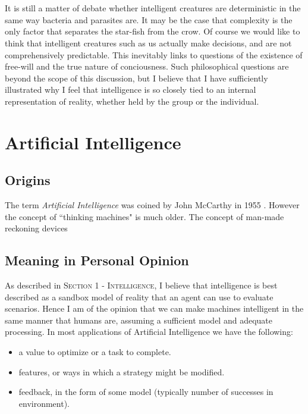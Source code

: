 \documentclass[10pt,a4paper]{article}
\begin{document}
				\\\\
				It is still a matter of debate whether intelligent creatures are deterministic in the same way bacteria and parasites are. It may be the case that complexity is the only factor that separates the star-fish from the crow. Of course we would like to think that intelligent creatures such as us actually make decisions, and are not comprehensively predictable. This inevitably links to questions of the existence of free-will and the true nature of conciousness. Such philosophical questions are beyond the scope of this discussion, but I believe that I have sufficiently illustrated why I feel that intelligence is so closely tied to an internal representation of reality, whether held by the group or the individual.
			
		\bigskip	
		\pagebreak
		\section{Artificial Intelligence}
		 	\subsection{Origins}
				The term \textsl{Artificial Intelligence} was coined by John McCarthy in 1955 \cite{intel}. However the concept of ``thinking machines" is much older. The concept of man-made reckoning devices
		
		
			\subsection{Meaning in Personal Opinion}
		
				As described in \textsc{Section 1 - Intelligence}, I believe that intelligence is best described as a sandbox model of reality that an agent can use to evaluate scenarios. Hence I am of the opinion that we can make machines intelligent in the same manner that humans are, assuming a sufficient model and adequate processing. In most applications of Artificial Intelligence we have the following: 
				
				\begin{itemize}
					\item a value to optimize or a task to complete.
					\item features, or ways in which a strategy might be modified.
					\item feedback, in the form of some model (typically number of successes in environment).
				\end{itemize}
				
\end{document}
